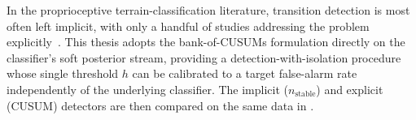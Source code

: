 In the proprioceptive terrain-classification literature, transition detection is most often left implicit, with only a handful of studies addressing the problem explicitly~\cite{Komma2009,Bai2019}. This thesis adopts the bank-of-CUSUMs formulation directly on the classifier's soft posterior stream, providing a detection-with-isolation procedure whose single threshold $h$ can be calibrated to a target false-alarm rate independently of the underlying classifier. The implicit ($n_{\text{stable}}$) and explicit (CUSUM) detectors are then compared on the same data in .











